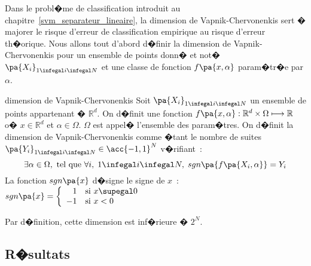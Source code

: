 


Dans le probl�me de classification introduit au chapitre~\ref{svm_separateur_lineaire}, la dimension de Vapnik-Chervonenkis sert � majorer le risque d'erreur de classification empirique au risque d'erreur th�orique. Nous allons tout d'abord d�finir la dimension de Vapnik-Chervonenkis pour un ensemble de points donn� et not� $\pa{X_i}_{1 \infegal i \infegal N}$ et une classe de fonction $f\pa{x,\alpha}$ param�tr�e par $\alpha$.



            \begin{xdefinition}{dimension de Vapnik-Chervonenkis}
            Soit $\pa{X_i}_{1 \infegal i \infegal N}$ un ensemble de points appartenant � $\mathbb{R}^d$. On d�finit une 
            fonction $f\pa{x,\alpha} : \mathbb{R}^d \times \Omega \longmapsto  \mathbb{R}$ 
            o� $x \in \mathbb{R}^d$ et $\alpha \in \Omega$.
            $\Omega$ est appel� l'ensemble des param�tres.
            On d�finit la dimension de Vapnik-Chervonenkis comme �tant le nombre de suites 
            $\pa{Y_i}_{1 \infegal i \infegal N} \in \acc{-1,1}^N$ v�rifiant~:
                    $$
                    \exists \alpha \in \Omega, \text{ tel que } \forall i, \; 1 \infegal i \infegal N, \;
                            sgn\pa{ f\pa{X_i,\alpha} } = Y_i
                    $$
            La fonction $sgn\pa{x}$ d�signe le signe de $x$~: $sgn\pa{x} = \left\{ \begin{array}{rl}
                                                                                                                         1 & \text{si } x \supegal 0 \\
                                                                                                                        -1 & \text{si } x < 0 
                                                                                                                        \end{array} \right. $
                                                                                                                        
            Par d�finition, cette dimension est inf�rieure � $2^N$.
            \end{xdefinition}





\subsection{R�sultats}
\label{svm_dimension_vc_lin}


